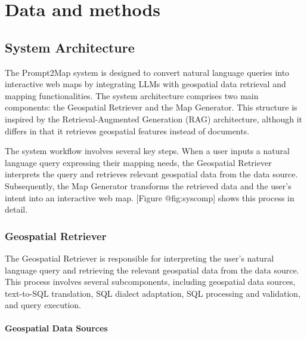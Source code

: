 
%

\chapter{Data and methods}
\label{cha:data_and_methods}

\section{System Architecture}

The Prompt2Map system is designed to convert natural language queries into interactive web maps by integrating LLMs with geospatial data retrieval and mapping functionalities. The system architecture comprises two main components: the Geospatial Retriever and the Map Generator. This structure is inspired by the Retrieval-Augmented Generation (RAG) architecture, although it differs in that it retrieves geospatial features instead of documents.

The system workflow involves several key steps. When a user inputs a natural language query expressing their mapping needs, the Geospatial Retriever interprets the query and retrieves relevant geospatial data from the data source. Subsequently, the Map Generator transforms the retrieved data and the user's intent into an interactive web map. [Figure @fig:syscomp] shows this process in detail.


\subsection{Geospatial Retriever}

The Geospatial Retriever is responsible for interpreting the user's natural language query and retrieving the relevant geospatial data from the data source. This process involves several subcomponents, including geospatial data sources, text-to-SQL translation, SQL dialect adaptation, SQL processing and validation, and query execution.

\subsubsection{Geospatial Data Sources}

